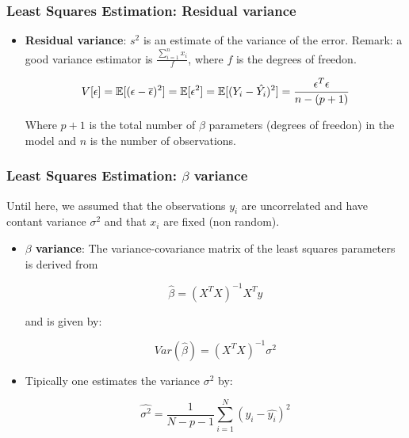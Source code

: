 \begin{frame}
    \frametitle{Least Squares Estimation: Residual variance}

    \begin{itemize}

        \item \textbf{Residual variance}: $s^2$ is an estimate of the variance of the
        error. Remark: a good variance estimator is $\frac{\sum_{i=1}^{n}x_{i}}{f}$, where
        $f$ is the degrees of freedon.

        $$V[\epsilon] = \operatorname*{\mathbb{E}}[(\epsilon - \overline{\epsilon})^2] = \operatorname*{\mathbb{E}}[\epsilon^2] = \operatorname*{\mathbb{E}}[(Y_i-\hat{Y_i})^2] = \frac{\epsilon^T\epsilon}{n-(p+1)}$$

        Where $p+1$ is the total number of $\beta$ parameters (degrees of freedon) in the model and
        $n$ is the number of observations.

    \end{itemize}

\end{frame}


\begin{frame}
    \frametitle{Least Squares Estimation: $\beta$ variance}

    Until here, we assumed that the observations $y_i$ are
    uncorrelated and have contant variance $\sigma^2$ and
    that $x_i$ are fixed (non random).

    \begin{itemize}

        \item \textbf{$\beta$ variance}: The variance-covariance matrix
        of the least squares parameters is derived from 

        $$\hat{\beta} = (X^TX)^{-1}X^Ty$$

        and is given by:

        $$Var(\hat{\beta})=(X^TX)^{-1}\sigma^2$$

        \item Tipically one estimates the variance $\sigma^2$ by:

        $$\hat{\sigma^2}=\frac{1}{N-p-1}\sum_{i=1}^{N}(y_i - \hat{y_i})^2$$

    \end{itemize}

\end{frame}

